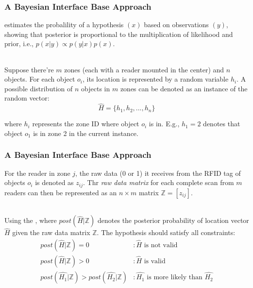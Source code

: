 
\begin{frame}
\frametitle{A Bayesian Interface Base Approach}

 estimates the probalility of a hypothesis $(x)$ based on observations $(y)$, showing that posterior is proportional to the multiplication of likelihood and prior, i.e., $p(x|y) \propto p(y|x)p(x)$.\\~\\\pause

Suppose there're $m$ zones (each with a reader mounted in the center) and $n$ objects. For each object $o_i$, its location is represented by a random variable $h_i$. A possible distribution of $n$ objects in $m$ zones can be denoted as an instance of the random vector:\pause
\begin{equation}
  \hat{H} = \{ h_1, h_2, ..., h_n \}
\end{equation}
\pause

where $h_i$ represents the zone ID where object $o_i$ is in. E.g., $h_1 = 2$ denotes that object $o_1$ is in zone 2 in the current instance.

\end{frame}


\begin{frame}
\frametitle{A Bayesian Interface Base Approach}

For the reader in zone $j$, the raw data (0 or 1) it receives from the RFID tag of objects $o_i$ is denoted as $z_{ij}$. Thr \emph{raw data matrix} for each complete scan from $m$ readers can then be represented as an $n \times m$ matrix $\mathbb{Z} = [z_{ij}]$. \\~\\ \pause

Using the , where $post(\hat{H}|\mathbb{Z})$ denotes the posterior probability of location vector $\hat{H}$ given the raw data matrix $\mathbb{Z}$. The hypothesis should satisfy all constraints: \pause
\begin{equation}
  \begin{split}
  post(\hat{H}|\mathbb{Z}) = 0 & :\hat{H} \textrm{ is not valid} \\
  post(\hat{H}|\mathbb{Z}) > 0 & :\hat{H} \textrm{ is valid} \\
  post(\hat{H_1}|\mathbb{Z}) > post(\hat{H_2}|\mathbb{Z}) & :\hat{H_1} \textrm{ is more likely than } \hat{H_2}
  \end{split}
\end{equation}

\end{frame}
